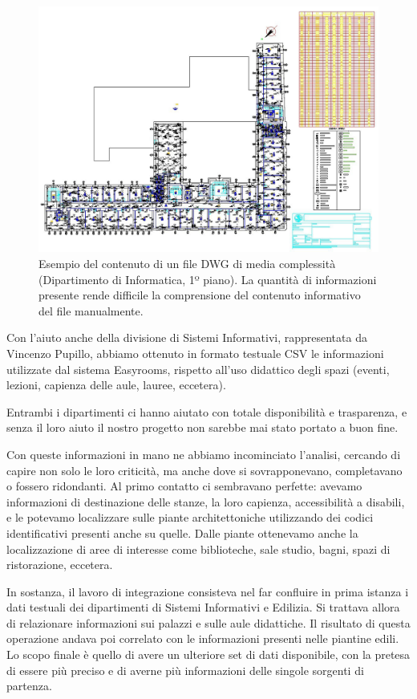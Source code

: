\documentclass[12pt]{report}
\begin{document}
\begin{figure}[H]
    \centering
    \includegraphics[width=\textwidth]{03-dxf-chaos.jpg}
    \caption{Esempio del contenuto di un file DWG di media complessità
(Dipartimento di Informatica, 1º piano). La quantità di informazioni
presente rende difficile la comprensione del contenuto informativo
del file manualmente. }
    \label{fig:dxf_chaos}
\end{figure}

Con l'aiuto anche della divisione di Sistemi Informativi, rappresentata
da Vincenzo Pupillo, abbiamo ottenuto in formato testuale CSV le
informazioni utilizzate dal sistema Easyrooms, rispetto all'uso didattico
degli spazi (eventi, lezioni, capienza delle aule, lauree, eccetera).

Entrambi i dipartimenti ci hanno aiutato con totale disponibilità e
trasparenza, e senza il loro aiuto il nostro progetto non sarebbe mai
stato portato a buon fine.

Con queste informazioni in mano ne abbiamo incominciato l'analisi,
cercando di capire non solo le loro criticità, ma anche dove si
sovrapponevano, completavano o fossero ridondanti. Al primo contatto
ci sembravano perfette: avevamo informazioni di destinazione delle
stanze, la loro capienza, accessibilità a disabili, e le potevamo
localizzare sulle piante architettoniche utilizzando dei codici
identificativi presenti anche su quelle. Dalle piante ottenevamo anche
la localizzazione di aree di interesse come biblioteche, sale studio, bagni,
spazi di ristorazione, eccetera.

In sostanza, il lavoro di integrazione consisteva nel far confluire in
prima istanza i dati testuali dei dipartimenti di Sistemi Informativi
e Edilizia. Si trattava allora di relazionare informazioni sui palazzi
e sulle aule didattiche. Il risultato di questa operazione andava 
poi correlato con le informazioni presenti nelle piantine edili. Lo scopo
finale è quello di avere un ulteriore set di dati disponibile, con la
pretesa di essere più preciso e di averne più informazioni delle
singole sorgenti di partenza.
\end{document}

